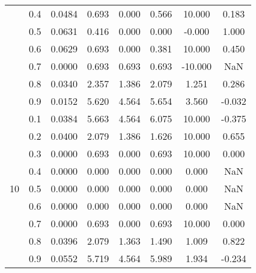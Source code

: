 \documentclass[11pt,a4paper]{report}
\begin{document}
\begin{longtable}{ | c | c || c | c | c | c | c | c | }
 & 0.4 & 0.0484 & 0.693 & 0.000 & 0.566 & 10.000 & 0.183 \\
 & 0.5 & 0.0631 & 0.416 & 0.000 & 0.000 & -0.000 & 1.000 \\
 & 0.6 & 0.0629 & 0.693 & 0.000 & 0.381 & 10.000 & 0.450 \\
 & 0.7 & 0.0000 & 0.693 & 0.693 & 0.693 & -10.000 & NaN \\
 & 0.8 & 0.0340 & 2.357 & 1.386 & 2.079 & 1.251 & 0.286 \\
 & 0.9 & 0.0152 & 5.620 & 4.564 & 5.654 & 3.560 & -0.032 \\
 \hline
\multirow{9}{*}{10} & 0.1 & 0.0384 & 5.663 & 4.564 & 6.075 & 10.000 & -0.375 \\
 & 0.2 & 0.0400 & 2.079 & 1.386 & 1.626 & 10.000 & 0.655 \\
 & 0.3 & 0.0000 & 0.693 & 0.000 & 0.693 & 10.000 & 0.000 \\
 & 0.4 & 0.0000 & 0.000 & 0.000 & 0.000 & 0.000 & NaN \\
 & 0.5 & 0.0000 & 0.000 & 0.000 & 0.000 & 0.000 & NaN \\
 & 0.6 & 0.0000 & 0.000 & 0.000 & 0.000 & 0.000 & NaN \\
 & 0.7 & 0.0000 & 0.693 & 0.000 & 0.693 & 10.000 & 0.000 \\
 & 0.8 & 0.0396 & 2.079 & 1.363 & 1.490 & 1.009 & 0.822 \\
 & 0.9 & 0.0552 & 5.719 & 4.564 & 5.989 & 1.934 & -0.234 \\
 \hline
\hline
\end{longtable}
\end{document}
